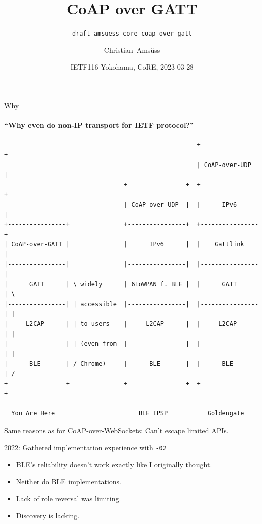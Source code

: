 \documentclass[aspectratio=169,colorlinks]{beamer}
\title{CoAP over GATT}
\subtitle{\texttt{draft-amsuess-core-coap-over-gatt}}
\author{Christian~Amsüss}
\date{IETF116 Yokohama, CoRE, 2023-03-28}
\begin{document}
\frame{\titlepage}

\begin{frame}[fragile]{Why}
	\framesubtitle{``Why even do non-IP transport for IETF protocol?''}

\vspace{-1cm}
\begin{verbatim}
                                                     +----------------+
                                                     | CoAP-over-UDP  |
                                 +----------------+  +----------------+                    
                                 | CoAP-over-UDP  |  |      IPv6      |
+----------------+               +----------------+  +----------------+  
| CoAP-over-GATT |               |      IPv6      |  |    Gattlink    |  
|----------------|               |----------------|  |----------------|  
|      GATT      | \ widely      | 6LoWPAN f. BLE |  |      GATT      | \
|----------------| | accessible  |----------------|  |----------------| |
|     L2CAP      | | to users    |     L2CAP      |  |     L2CAP      | |
|----------------| | (even from  |----------------|  |----------------| |
|      BLE       | / Chrome)     |      BLE       |  |      BLE       | /
+----------------+               +----------------+  +----------------+  

  You Are Here                       BLE IPSP           Goldengate
	\end{verbatim}

	\large Same reasons as for CoAP-over-WebSockets: Can't escape limited APIs.

\end{frame}

\begin{frame}{2022: Gathered implementation experience with \texttt{-02}}\Large
	\begin{itemize}
		\item BLE's reliability doesn't work exactly like I originally thought.
		\item Neither do BLE implementations.
		\item Lack of role reversal was limiting.
		\item Discovery is lacking.
	\end{itemize}
\end{frame}
\end{document}
